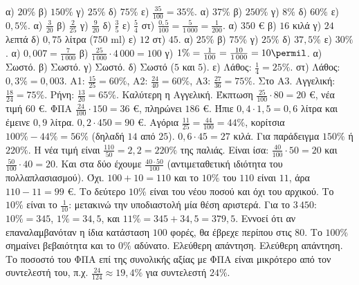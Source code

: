  α) $20\%$ \quad β) $150\%$ \quad γ) $25\%$ \quad δ) $75\%$ \quad ε) $\frac{35}{100}=35\%$.
 α) $37\%$ \quad β) $250\%$ \quad γ) $8\%$ \quad δ) $60\%$ \quad ε) $0{,}5\%$.
 α) $\frac{3}{20}$ \quad β) $\frac{2}{25}$ \quad γ) $\frac{9}{20}$ \quad δ) $\frac{3}{5}$ \quad ε) $\frac{5}{4}$ \quad στ) $\frac{0{,}5}{100}=\frac{5}{1\,000}=\frac{1}{200}$.
 α) $350$ € \quad β) $16$ κιλά \quad γ) $24$ λεπτά \quad δ) $0{,}75$ λίτρα ($750$ ml) \quad ε) $12$ \quad στ) $45$.
 α) $25\%$ \quad β) $75\%$ \quad γ) $25\%$ \quad δ) $37{,}5\%$ \quad ε) $30\%$.
 α) $0{,}007=\frac{7}{1\,000}$ \quad β) $\frac{25}{1\,000}\cdot4\,000=100$ \quad γ) $1\%=\frac{1}{100}=\frac{10}{1\,000}=10\permil$.
 α) Σωστό. β) Σωστό. γ) Σωστό. δ) Σωστό ($5$ και $5$). ε) Λάθος: $\frac{1}{4}=25\%$. στ) Λάθος: $0{,}3\%=0{,}003$.
 Α1: $\frac{15}{25}=60\%$, Α2: $\frac{24}{40}=60\%$, Α3: $\frac{27}{36}=75\%$. Στο Α3.
 Αγγελική: $\frac{18}{24}=75\%$. Ρήνη: $\frac{13}{20}=65\%$. Καλύτερη η Αγγελική.
 Έκπτωση $\frac{25}{100}\cdot80=20$ €, νέα τιμή $60$ €.
 ΦΠΑ $\frac{24}{100}\cdot150=36$ €, πληρώνει $186$ €.
 Ήπιε $0{,}4\cdot1{,}5=0{,}6$ λίτρα και έμεινε $0{,}9$ λίτρα.
 $0{,}2\cdot450=90$ €.
 Αγόρια $\frac{11}{25}=\frac{44}{100}=44\%$, κορίτσια $100\%-44\%=56\%$ (δηλαδή $14$ από $25$).
 $0{,}6\cdot45=27$ κιλά.
 Για παράδειγμα $150\%$ ή $220\%$. Η νέα τιμή είναι $\frac{110}{50}=2{,}2=220\%$ της παλιάς.
 Είναι ίσα: $\frac{40}{100}\cdot50=20$ και $\frac{50}{100}\cdot40=20$. Και στα δύο έχουμε $\frac{40\cdot50}{100}$ (αντιμεταθετική ιδιότητα του πολλαπλασιασμού).
 Όχι. $100+10=110$ και το $10\%$ του $110$ είναι $11$, άρα $110-11=99$ €. Το δεύτερο $10\%$ είναι του νέου ποσού και όχι του αρχικού.
 Το $10\%$ είναι το $\frac{1}{10}$: μετακινώ την υποδιαστολή μία θέση αριστερά. Για το $3\,450$: $10\%=345$, $1\%=34{,}5$, και $11\%=345+34{,}5=379{,}5$.
 Εννοεί ότι αν επαναλαμβανόταν η ίδια κατάσταση $100$ φορές, θα έβρεχε περίπου στις $80$. Το $100\%$ σημαίνει βεβαιότητα και το $0\%$ αδύνατο.
 Ελεύθερη απάντηση.
 Ελεύθερη απάντηση. Το ποσοστό του ΦΠΑ επί της συνολικής αξίας με ΦΠΑ είναι μικρότερο από τον συντελεστή του, π.χ. $\frac{24}{124}\approx19{,}4\%$ για συντελεστή $24\%$.
